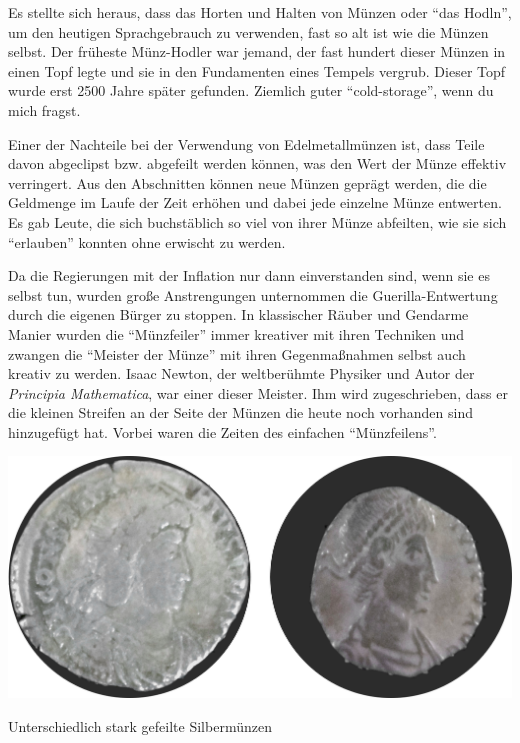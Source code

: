 Es stellte sich heraus, dass das Horten und Halten von Münzen oder “das Hodln”,
um den heutigen Sprachgebrauch zu verwenden, fast so alt ist wie die Münzen
selbst. Der früheste Münz-Hodler war jemand, der fast hundert dieser Münzen in
einen Topf legte und sie in den Fundamenten eines Tempels vergrub. Dieser Topf
wurde erst 2500 Jahre später gefunden. Ziemlich guter \enquote{cold-storage},
wenn du mich fragst.

Einer der Nachteile bei der Verwendung von Edelmetallmünzen ist, dass Teile
davon abgeclipst bzw. abgefeilt werden können, was den Wert der Münze effektiv
verringert. Aus den Abschnitten können neue Münzen geprägt werden, die die
Geldmenge im Laufe der Zeit erhöhen und dabei jede einzelne Münze entwerten. Es
gab Leute, die sich buchstäblich so viel von ihrer Münze abfeilten, wie sie sich
\enquote{erlauben} konnten ohne erwischt zu werden.

Da die Regierungen mit der Inflation nur dann einverstanden sind, wenn sie es
selbst tun, wurden große Anstrengungen unternommen die Guerilla-Entwertung durch
die eigenen Bürger zu stoppen. In klassischer Räuber und Gendarme Manier
wurden die \enquote{Münzfeiler} immer kreativer mit ihren Techniken und zwangen
die \enquote{Meister der Münze} mit ihren Gegenmaßnahmen selbst auch kreativ zu
werden. Isaac Newton, der weltberühmte Physiker und Autor der \textit{Principia
Mathematica}, war einer dieser Meister. Ihm wird zugeschrieben, dass er die
kleinen Streifen an der Seite der Münzen die heute noch vorhanden sind
hinzugefügt hat. Vorbei waren die Zeiten des einfachen \enquote{Münzfeilens}.

\begin{center}
  \includegraphics[width=\textwidth]{assets/images/clipped-coins.png}
  \caption{Unterschiedlich stark gefeilte Silbermünzen}
  \label{fig:clipped-coins}
\end{center}

